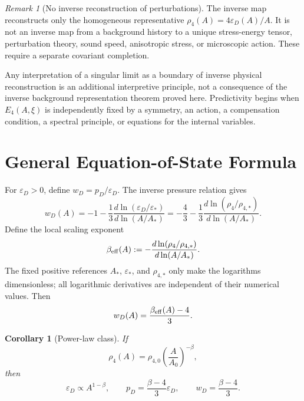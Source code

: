 \documentclass[11pt,a4paper]{article}
\def\dd{d}%
\numberwithin{equation}{section}
\theoremstyle{definition}
\theoremstyle{plain}
\newtheorem{corollary}[criterion]{Corollary}
\theoremstyle{remark}
\newtheorem{remark}[criterion]{Remark}
\newcommand{\Efour}{E_4}
\newcommand{\rhoFour}{\rho_4}
\newcommand{\epsD}{\varepsilon_D}
\newcommand{\pD}{p_D}
\newcommand{\dd}{\mathrm{d}}
\begin{document}
\begin{remark}[No inverse reconstruction of perturbations]
The inverse map reconstructs only the homogeneous representative \(\rhoFour(A)=4\epsD(A)/A\). It is not an inverse map from a background history to a unique stress-energy tensor, perturbation theory, sound speed, anisotropic stress, or microscopic action. These require a separate covariant completion.
\end{remark}

Any interpretation of a singular limit as a boundary of inverse physical reconstruction is an additional interpretive principle, not a consequence of the inverse background representation theorem proved here. Predictivity begins when \(\Efour(A,\xi)\) is independently fixed by a symmetry, an action, a compensation condition, a spectral principle, or equations for the internal variables.

\section{General Equation-of-State Formula}
For \(\epsD>0\), define \(w_D=\pD/\epsD\). The inverse pressure relation gives
\begin{equation}
w_D(A)
=-1-\frac13\frac{\dd\ln(\epsD/\varepsilon_*)}{\dd\ln(A/A_*)}
=-\frac43-\frac13\frac{\dd\ln(\rhoFour/\rho_{4,*})}{\dd\ln(A/A_*)}.
\end{equation}
Define the local scaling exponent
\begin{equation}
\beta_{\rm eff}(A):=-\frac{\dd\ln(\rhoFour/\rho_{4,*})}{\dd\ln(A/A_*)}.
\end{equation}
The fixed positive references \(A_*\), \(\varepsilon_*\), and \(\rho_{4,*}\) only make the logarithms dimensionless; all logarithmic derivatives are independent of their numerical values.
Then
\begin{equation}
w_D(A)=\frac{\beta_{\rm eff}(A)-4}{3}.
\end{equation}

\begin{corollary}[Power-law class]
If
\begin{equation}
\rhoFour(A)=\rho_{4,0}\left(\frac{A}{A_0}\right)^{-\beta},
\end{equation}
then
\begin{equation}
\epsD\propto A^{1-\beta},
\qquad
\pD=\frac{\beta-4}{3}\epsD,
\qquad
w_D=\frac{\beta-4}{3}.
\end{equation}
\end{corollary}
\end{document}
